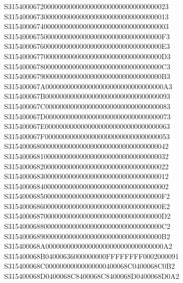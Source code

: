 \documentclass[12pt,a4paper]{article}
\begin{document}
\begin{framed}
{S315400067200000000000000000000000000000000023\newline
S315400067300000000000000000000000000000000013\newline
S315400067400000000000000000000000000000000003\newline
S3154000675000000000000000000000000000000000F3\newline
S3154000676000000000000000000000000000000000E3\newline
S3154000677000000000000000000000000000000000D3\newline
S3154000678000000000000000000000000000000000C3\newline
S3154000679000000000000000000000000000000000B3\newline
S315400067A000000000000000000000000000000000A3\newline
S315400067B00000000000000000000000000000000093\newline
S315400067C00000000000000000000000000000000083\newline
S315400067D00000000000000000000000000000000073\newline
S315400067E00000000000000000000000000000000063\newline
S315400067F00000000000000000000000000000000053\newline
S315400068000000000000000000000000000000000042\newline
S315400068100000000000000000000000000000000032\newline
S315400068200000000000000000000000000000000022\newline
S315400068300000000000000000000000000000000012\newline
S315400068400000000000000000000000000000000002\newline
S3154000685000000000000000000000000000000000F2\newline
S3154000686000000000000000000000000000000000E2\newline
S3154000687000000000000000000000000000000000D2\newline
S3154000688000000000000000000000000000000000C2\newline
S3154000689000000000000000000000000000000000B2\newline
S315400068A000000000000000000000000000000000A2\newline
S315400068B04000636000000000FFFFFFFF0002000091\newline
S315400068C00000000000000000400068C0400068C0B2\newline
S315400068D0400068C8400068C8400068D0400068D0A2\newline
}
\end{framed}
\end{document}
